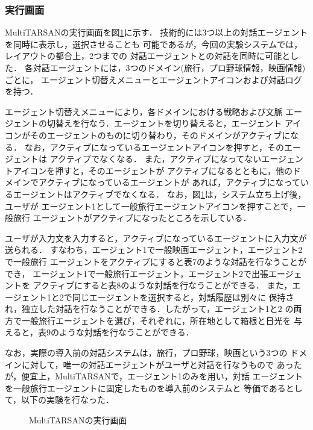 \subsubsection{実行画面}
MultiTARSANの実行画面を図\ref{fig:main-w}に示す．
技術的には3つ以上の対話エージェントを同時に表示し，選択させることも
可能であるが，今回の実験システムでは，レイアウトの都合上，2つまでの
対話エージェントとの対話を同時に可能とした．
各対話エージェントには，3つのドメイン(旅行，プロ野球情報，映画情報)ごとに，
エージェント切替えメニューとエージェントアイコンおよび対話ログを持つ．

エージェント切替えメニューにより，各ドメインにおける戦略および文脈
エージェントの切替えを行なう．エージェントを切り替えると，エージェント
アイコンがそのエージェントのものに切り替わり，そのドメインがアクティブになる．
なお，アクティブになっているエージェントアイコンを押すと，そのエージェントは
アクティブでなくなる．
また，アクティブになってないエージェントアイコンを押すと，そのエージェントが
アクティブになるとともに，他のドメインでアクティブになっているエージェントが
あれば，アクティブになっているエージェントはアクティブでなくなる．
なお，図\ref{fig:main-w}は，システム立ち上げ後，ユーザが
エージェント1として一般旅行エージェントアイコンを押すことで，一般旅行
エージェントがアクティブになったところを示している．

ユーザが入力文を入力すると，アクティブになっているエージェントに入力文が
送られる．
すなわち，エージェント1で一般映画エージェント，エージェント2で一般旅行
エージェントをアクティブにすると表7のような対話を行なうことができ，
エージェント1で一般旅行エージェント，エージェント2で出張エージェントを
アクティブにすると表8のような対話を行なうことができる．
また，エージェント1と2で同じエージェントを選択すると，対話履歴は別々に
保持され，独立した対話を行なうことができる．したがって，エージェント1と2
の両方で一般旅行エージェントを選び，それぞれに，所在地として箱根と日光を
与えると，表9のような対話を行なうことができる．

なお，実際の導入前の対話システムは，旅行，プロ野球，映画という3つの
ドメインに対して，唯一の対話エージェントがユーザと対話を行なうもので
あったが，便宜上，MultiTARSANで，エージェント1のみを用い，対話
エージェントを一般旅行エージェントに固定したものを導入前のシステムと
等価であるとして，以下の実験を行なった．

\begin{figure}[htbp]
\begin{center}
\end{center}
\caption{MultiTARSANの実行画面}\label{fig:main-w}
\end{figure}
